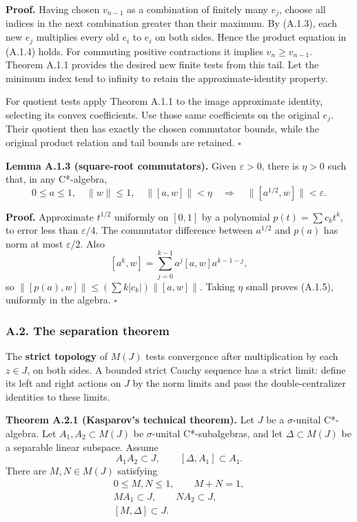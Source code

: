\documentclass[
  11pt,
]{article}
\begin{document}
\textbf{Proof.} Having chosen \(v_{n-1}\) as a combination of finitely
many \(e_j\), choose all indices in the next combination greater than
their maximum. By (A.1.3), each new \(e_j\) multiplies every old \(e_i\)
to \(e_i\) on both sides. Hence the product equation in (A.1.4) holds.
For commuting positive contractions it implies \(v_n\geq v_{n-1}\).
Theorem A.1.1 provides the desired new finite tests from this tail. Let
the minimum index tend to infinity to retain the approximate-identity
property.

For quotient tests apply Theorem A.1.1 to the image approximate
identity, selecting its convex coefficients. Use those same coefficients
on the original \(e_j\). Their quotient then has exactly the chosen
commutator bounds, while the original product relation and tail bounds
are retained. \(\square\)

\textbf{Lemma A.1.3 (square-root commutators).} Given \(\varepsilon>0\),
there is \(\eta>0\) such that, in any C*-algebra, \[
0\leq a\leq1,\quad\|w\|\leq1,\quad
\|[a,w]\|<\eta
\quad\Longrightarrow\quad
\|[a^{1/2},w]\|<\varepsilon.
\tag{A.1.5}
\]

\textbf{Proof.} Approximate \(t^{1/2}\) uniformly on \([0,1]\) by a
polynomial \(p(t)=\sum c_kt^k\), to error less than \(\varepsilon/4\).
The commutator difference between \(a^{1/2}\) and \(p(a)\) has norm at
most \(\varepsilon/2\). Also \[
[a^k,w]=\sum_{j=0}^{k-1}a^j[a,w]a^{k-1-j},
\] so \(\|[p(a),w]\|\leq(\sum k|c_k|)\|[a,w]\|\). Taking \(\eta\) small
proves (A.1.5), uniformly in the algebra. \(\square\)

\subsubsection{A.2. The separation
theorem}\label{a.2.-the-separation-theorem}

The \textbf{strict topology} of \(M(J)\) tests convergence after
multiplication by each \(z\in J\), on both sides. A bounded strict
Cauchy sequence has a strict limit: define its left and right actions on
\(J\) by the norm limits and pass the double-centralizer identities to
these limits.

\textbf{Theorem A.2.1 (Kasparov's technical theorem).} Let \(J\) be a
\(\sigma\)-unital C*-algebra. Let \(A_1,A_2\subset M(J)\) be
\(\sigma\)-unital C*-subalgebras, and let \(\Delta\subset M(J)\) be a
separable linear subspace. Assume \[
A_1A_2\subset J,\qquad [\Delta,A_1]\subset A_1.
\tag{A.2.1}
\] There are \(M,N\in M(J)\) satisfying \[
\begin{gathered}
0\leq M,N\leq1,\qquad M+N=1,\\
MA_1\subset J,\qquad NA_2\subset J,\\
[M,\Delta]\subset J.
\end{gathered}
\tag{A.2.2}
\]
\end{document}
